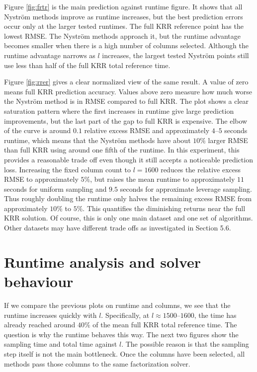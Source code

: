 Figure \ref{fig:frtr} is the main prediction against runtime figure. It shows that all Nystr\"om methods improve as runtime increases, but the best prediction errors occur only at the larger tested runtimes. The full KRR reference point has the lowest RMSE. The Nystr\"om methods approach it, but the runtime advantage becomes smaller when there is a high number of columns selected. Although the runtime advantage narrows as $l$ increases, the largest tested Nystr\"om points still use less than half of the full KRR total reference time.

Figure \ref{fig:rrer} gives a clear normalized view of the same result. A value of zero means full KRR prediction accuracy. Values above zero measure how much worse the Nystr\"om method is in RMSE compared to full KRR. The plot shows a clear saturation pattern where the first increases in runtime give large prediction improvements, but the last part of the gap to full KRR is expensive. The elbow of the curve is around $0.1$ relative excess RMSE and approximately $4$--$5$ seconds runtime, which means that the Nystr\"om methods have about $10\%$ larger RMSE than full KRR using around one fifth of the runtime. In this experiment, this provides a reasonable trade off even though it still accepts a noticeable prediction loss. Increasing the fixed column count to $l=1600$ reduces the relative excess RMSE to approximately $5\%$, but raises the mean runtime to approximately $11$ seconds for uniform sampling and $9.5$ seconds for approximate leverage sampling. Thus roughly doubling the runtime only halves the remaining excess RMSE from approximately $10\%$ to $5\%$. This quantifies the diminishing returns near the full KRR solution. Of course, this is only one main dataset and one set of algorithms. Other datasets may have different trade offs as investigated in Section 5.6. 

\section{Runtime analysis and solver behaviour}

If we compare the previous plots on runtime and columns, we see that the runtime increases quickly with $l$. Specifically, at $l\approx1500$--$1600$, the time has already reached around $40\%$ of the mean full KRR total reference time. The question is why the runtime behaves this way. The next two figures show the sampling time and total time against $l$. The possible reason is that the sampling step itself is not the main bottleneck. Once the columns have been selected, all methods pass those columns to the same factorization solver.

